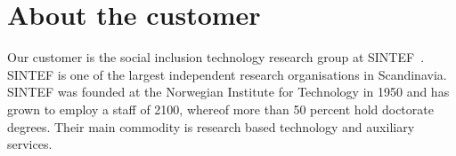\section{About the customer}

Our customer is the social inclusion technology research group at SINTEF~\cite{sintef}. SINTEF is one of the largest independent research organisations in Scandinavia. SINTEF was founded at the Norwegian Institute for Technology in 1950 and has grown to employ a staff of 2100, whereof more than 50 percent hold doctorate degrees. Their main commodity is research based technology and auxiliary services.